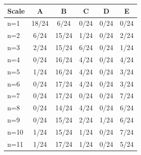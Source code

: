 \begin{tabular}{lccccc}
\toprule
Scale & \cellcolor[HTML]{FFFFFF} A & \cellcolor[HTML]{EA4646} B & \cellcolor[HTML]{9670BD} C & \cellcolor[HTML]{8FEB32} D & \cellcolor[HTML]{19C8C8} E \\
\midrule
n=1 & \cellcolor[HTML]{FFFFFF} 18/24 & \cellcolor[HTML]{EA4646} 6/24 & \cellcolor[HTML]{9670BD} 0/24 & \cellcolor[HTML]{8FEB32} 0/24 & \cellcolor[HTML]{19C8C8} 0/24 \\
n=2 & \cellcolor[HTML]{FFFFFF} 6/24 & \cellcolor[HTML]{EA4646} 15/24 & \cellcolor[HTML]{9670BD} 1/24 & \cellcolor[HTML]{8FEB32} 0/24 & \cellcolor[HTML]{19C8C8} 2/24 \\
n=3 & \cellcolor[HTML]{FFFFFF} 2/24 & \cellcolor[HTML]{EA4646} 15/24 & \cellcolor[HTML]{9670BD} 6/24 & \cellcolor[HTML]{8FEB32} 0/24 & \cellcolor[HTML]{19C8C8} 1/24 \\
n=4 & \cellcolor[HTML]{FFFFFF} 0/24 & \cellcolor[HTML]{EA4646} 16/24 & \cellcolor[HTML]{9670BD} 4/24 & \cellcolor[HTML]{8FEB32} 0/24 & \cellcolor[HTML]{19C8C8} 4/24 \\
n=5 & \cellcolor[HTML]{FFFFFF} 1/24 & \cellcolor[HTML]{EA4646} 16/24 & \cellcolor[HTML]{9670BD} 4/24 & \cellcolor[HTML]{8FEB32} 0/24 & \cellcolor[HTML]{19C8C8} 3/24 \\
n=6 & \cellcolor[HTML]{FFFFFF} 0/24 & \cellcolor[HTML]{EA4646} 17/24 & \cellcolor[HTML]{9670BD} 4/24 & \cellcolor[HTML]{8FEB32} 0/24 & \cellcolor[HTML]{19C8C8} 3/24 \\
n=7 & \cellcolor[HTML]{FFFFFF} 0/24 & \cellcolor[HTML]{EA4646} 17/24 & \cellcolor[HTML]{9670BD} 0/24 & \cellcolor[HTML]{8FEB32} 0/24 & \cellcolor[HTML]{19C8C8} 7/24 \\
n=8 & \cellcolor[HTML]{FFFFFF} 0/24 & \cellcolor[HTML]{EA4646} 14/24 & \cellcolor[HTML]{9670BD} 4/24 & \cellcolor[HTML]{8FEB32} 0/24 & \cellcolor[HTML]{19C8C8} 6/24 \\
n=9 & \cellcolor[HTML]{FFFFFF} 0/24 & \cellcolor[HTML]{EA4646} 15/24 & \cellcolor[HTML]{9670BD} 2/24 & \cellcolor[HTML]{8FEB32} 1/24 & \cellcolor[HTML]{19C8C8} 6/24 \\
n=10 & \cellcolor[HTML]{FFFFFF} 1/24 & \cellcolor[HTML]{EA4646} 15/24 & \cellcolor[HTML]{9670BD} 1/24 & \cellcolor[HTML]{8FEB32} 0/24 & \cellcolor[HTML]{19C8C8} 7/24 \\
n=11 & \cellcolor[HTML]{FFFFFF} 1/24 & \cellcolor[HTML]{EA4646} 17/24 & \cellcolor[HTML]{9670BD} 1/24 & \cellcolor[HTML]{8FEB32} 0/24 & \cellcolor[HTML]{19C8C8} 5/24 \\

\end{tabular}
